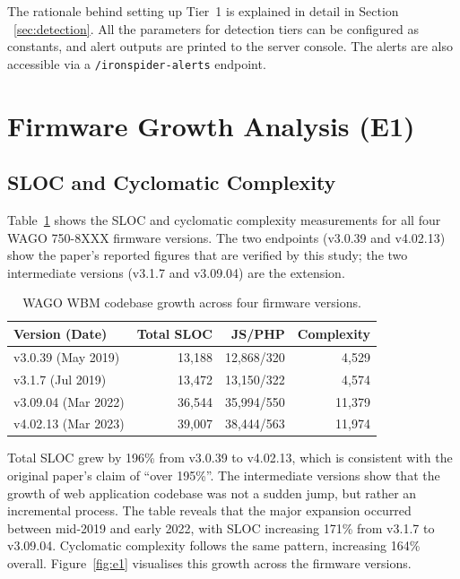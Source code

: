 \documentclass[conference]{IEEEtran}
\begin{document}
The rationale behind setting up Tier~1 is explained in detail in Section ~\ref{sec:detection}. All the parameters for detection tiers can be configured as constants, and alert outputs are printed to the server console. The alerts are also accessible via a \texttt{/ironspider-alerts} endpoint.

\section{Firmware Growth Analysis (E1)}
\label{sec:e1}

\subsection{SLOC and Cyclomatic Complexity}

Table~\ref{tab:e1} shows the SLOC and cyclomatic complexity measurements for all four WAGO 750-8XXX firmware versions. The two endpoints (v3.0.39 and v4.02.13) show the paper's reported figures that are verified by this study; the two intermediate versions (v3.1.7 and v3.09.04) are the extension.

\begin{table}[ht]
\centering
\caption{WAGO WBM codebase growth across four firmware versions.}
\label{tab:e1}
\small
\begin{tabular}{@{}lrrr@{}}
\toprule
\textbf{Version (Date)} & \textbf{Total SLOC} & \textbf{JS/PHP}
  & \textbf{Complexity} \\
\midrule
v3.0.39 (May 2019)  & 13{,}188 & 12{,}868/320 & 4{,}529 \\
v3.1.7 (Jul 2019)   & 13{,}472 & 13{,}150/322 & 4{,}574 \\
v3.09.04 (Mar 2022) & 36{,}544 & 35{,}994/550 & 11{,}379 \\
v4.02.13 (Mar 2023) & 39{,}007 & 38{,}444/563 & 11{,}974 \\
\bottomrule
\end{tabular}
\end{table}

Total SLOC grew by 196\% from v3.0.39 to v4.02.13, which is consistent with the original paper's claim of ``over 195\%''. The intermediate versions show that the growth of web application codebase was not a sudden jump, but rather an incremental process. The table reveals that the major expansion occurred between mid-2019 and early 2022, with SLOC increasing 171\% from v3.1.7 to v3.09.04. Cyclomatic complexity follows the same pattern, increasing 164\% overall. Figure~\ref{fig:e1} visualises this growth across the firmware versions.
\end{document}

